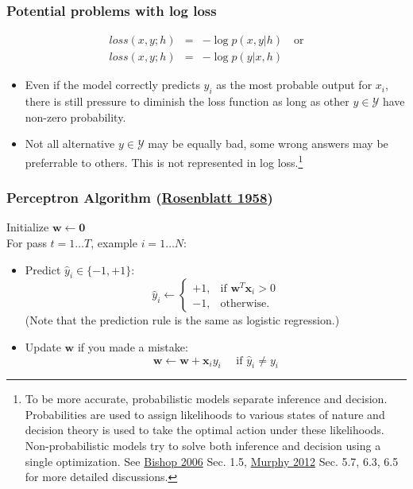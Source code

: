 \documentclass[ignorenonframetext,plain,fleqn]{beamer}
\newcommand{\loss}{\mathit{loss}}
\renewcommand{\vec}{\mathbf}
\begin{document}
\begin{frame}\frametitle{Potential problems with log loss}
\begin{eqnarray*}
\loss(x, y; h) &=& -\log p(x, y | h)\quad\text{or}\\
\loss(x, y; h) &=& -\log p(y | x, h)
\end{eqnarray*}
\begin{itemize}
\item Even if the model correctly predicts $y_i$ as the most probable
  output for $x_i$, there is still pressure to diminish the loss
  function as long as other $y\in\mathcal{Y}$ have non-zero
  probability.
\item Not all alternative $y\in\mathcal{Y}$ may be equally bad, some
  wrong answers may be preferrable to others.  This is not represented
  in log loss.\footnote{To be more accurate, probabilistic models
    separate inference and decision.  Probabilities are used to assign
    likelihoods to various states of nature and decision theory is
    used to take the optimal action under these likelihoods.
    Non-probabilistic models try to solve both inference and decision
    using a single optimization.  See 
    \href{http://research.microsoft.com/en-us/um/people/cmbishop/prml}{Bishop
      2006} Sec. 1.5, \href{http://www.cs.ubc.ca/~murphyk/MLbook}{Murphy
      2012} Sec. 5.7, 6.3, 6.5 for more detailed discussions.
  }
\end{itemize}
\end{frame}


\begin{frame}\frametitle{Perceptron Algorithm 
(\href{http://www2.denizyuret.com/bibtex.php?fn=show&nselect=1&e1=986}{Rosenblatt 1958})}
Initialize $\vec{w} \leftarrow \vec{0}$\\
For pass $t=1\dots T$, example $i=1\dots N$:\\
\begin{itemize}
\item Predict $\hat{y}_i\in\{-1,+1\}$:
\[
\hat{y}_i \leftarrow \begin{cases}
+1,& \text{if } \vec{w}^T \vec{x}_i > 0\\
-1,& \text{otherwise.}
\end{cases}
\]
{\small (Note that the prediction rule is the same as logistic regression.)}
\item Update $\vec{w}$ if you made a mistake:
\[\vec{w} \leftarrow \vec{w} 
+ \vec{x}_i y_i
\quad\text{ if } \hat{y}_i \neq y_i
\]
\end{itemize}
\end{frame}
\end{document}
